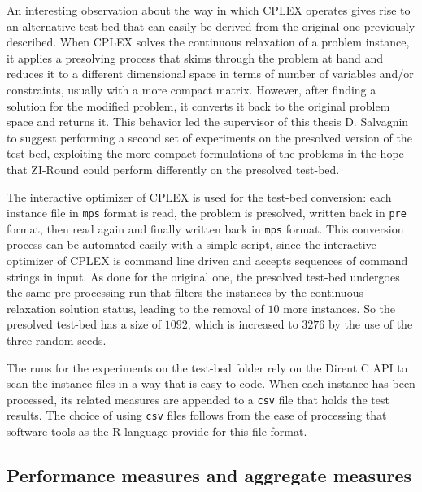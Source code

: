 \documentclass[a4paper,12pt,twoside]{scrbook}
\begin{document}
An interesting observation about the way in which CPLEX operates gives rise to an alternative test-bed that can easily be derived from the original one previously described.
When CPLEX solves the continuous relaxation of a problem instance, it applies a presolving process that skims through the problem at hand and reduces it to a different dimensional space in terms of number of variables and/or constraints, usually with a more compact matrix. However, after finding a solution for the modified problem, it converts it back to the original problem space and returns it. This behavior led the supervisor of this thesis D. Salvagnin to suggest performing a second set of experiments on the presolved version of the test-bed, exploiting the more compact formulations of the problems in the hope that ZI-Round could perform differently on the presolved test-bed. \par 

The interactive optimizer of CPLEX is used for the test-bed conversion: each instance file in \texttt{mps} format is read, the problem is presolved, written back in \texttt{pre} format, then read again and finally written back in \texttt{mps} format. This conversion process can be automated easily with a simple script, since the interactive optimizer of CPLEX is command line driven and accepts sequences of command strings in input. As done for the original one, the presolved test-bed undergoes the same pre-processing run that filters the instances by the continuous relaxation solution status, leading to the removal of $10$ more instances. So the presolved test-bed has a size of $1092$, which is increased to $3276$ by the use of the three random seeds. \par

The runs for the experiments on the test-bed folder rely on the Dirent C API to scan the instance files in a way that is easy to code. When each instance has been processed, its related measures are appended to a \texttt{csv} file that holds the test results. The choice of using \texttt{csv} files follows from the ease of processing that software tools as the R language provide for this file format.

\subsection{Performance measures and aggregate measures}
\end{document}
